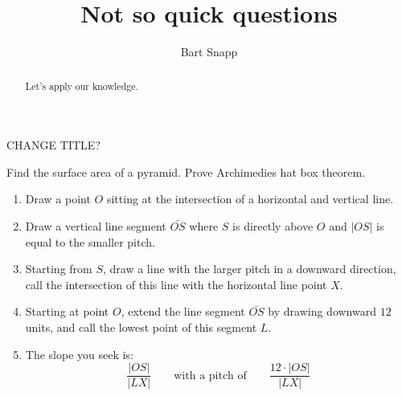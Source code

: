 \documentclass[handout,nooutcomes,noauthor]{ximera}
\title{Not so quick questions}
\author{Bart Snapp}
\begin{document}
\begin{abstract}
  Let's apply our knowledge.
\end{abstract}
\maketitle


\begin{listOutcomes}
\item 
\end{listOutcomes}


\mynewpage



CHANGE TITLE?

Find the surface area of a pyramid.
Prove Archimedies hat box theorem.



\begin{question}
  
\end{question}

\mynewpage


\begin{question}
  \begin{enumerate}
  \item Draw a point $O$ sitting at the intersection of a horizontal
    and vertical line.
  \item Draw a vertical line segment $\bar{OS}$ where $S$ is directly
    above $O$ and $|OS|$ is equal to the smaller pitch.
  \item Starting from $S$, draw a line with the larger pitch in a
    downward direction, call the intersection of this line with the
    horizontal line point $X$.
  \item Starting at point $O$, extend the line segment $\bar{OS}$ by
    drawing downward $12$ units, and call the lowest point of this
    segment $L$.
  \item The slope you seek is:
    \[
    \frac{|OS|}{|LX|}\qquad \text{with a pitch of} \qquad \frac{12\cdot |OS|}{|LX|}
    \]
    
  \end{enumerate}
\end{question}

\mynewpage


\begin{question}
  
\end{question}
\end{document}
